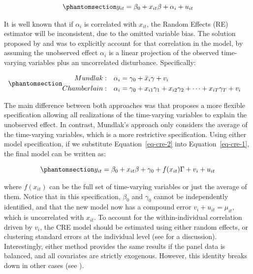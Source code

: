 \documentclass[bib]{statapress}
\begin{document}
\begin{equation}\phantomsection\label{eq-cre-1}{y_{it} = \beta_0 + x_{it}\beta  + \alpha_i + u_{it}
}\end{equation}

It is well known that if \(\alpha_i\) is correlated with \(x_{it}\), the
Random Effects (RE) estimator will be inconsistent, due to the omitted
variable bias. The solution proposed by \citet{mundlak1978} and
\citet{chamberlain1982} was to explicitly account for that correlation
in the model, by assuming the unobserved effect \(\alpha_i\) is a linear
projection of the observed time-varying variables plus an uncorrelated
disturbance. Specifically:

\begin{equation}\phantomsection\label{eq-cre-2}{\begin{aligned}
Mundlak:  & & \alpha_i &= \gamma_0 + \bar x_{i}\gamma + v_i&  \\
Chamberlain: & & \alpha_i &= \gamma_0 + x_{i1}\gamma_1 + x_{i2}\gamma_2 + \dots + x_{iT}\gamma_T + v_i 
\end{aligned}
}\end{equation}

The main difference between both approaches was that
\citet{chamberlain1982} proposes a more flexible specification allowing
all realizations of the time-varying variables to explain the unobserved
effect. In contrast, Mundlak's approach only considers the average of
the time-varying variables, which is a more restrictive specification.
Using either model specification, if we substitute
Equation~\ref{eq-cre-2} into Equation~\ref{eq-cre-1}, the final model
can be written as:

\begin{equation}\phantomsection\label{eq-cre-final}{y_{it} = \beta_0 + x_{it}\beta  + \gamma_0 + f(x_{it})\Gamma + v_i + u_{it}
}\end{equation}

where \(f(x_{it})\) can be the full set of time-varying variables or
just the average of them. Notice that in this specification, \(\beta_0\)
and \(\gamma_0\) cannot be independently identified, and that the new
model now has a compound error \(v_i + u_{it}=\mu_{it}\), which is
uncorrelated with \(x_{it}\). To account for the within-individual
correlation driven by \(v_i\), the CRE model should be estimated using
either random effects, or clustering standard errors at the individual
level (see \citet{wooldridge2010} for a discussion). Interestingly,
either method provides the same results if the panel data is balanced,
and all covariates are strictly exogenous. However, this identity breaks
down in other cases (see \citet{abrevaya2013}).
\end{document}
